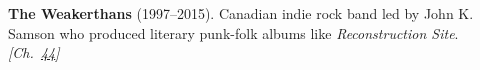 \textbf{The Weakerthans} (1997–2015). Canadian indie rock band led by John K. Samson who produced literary punk-folk albums like \emph{Reconstruction Site}. \emph{[Ch.~\hyperref[ch:ironmask]{44}]}

